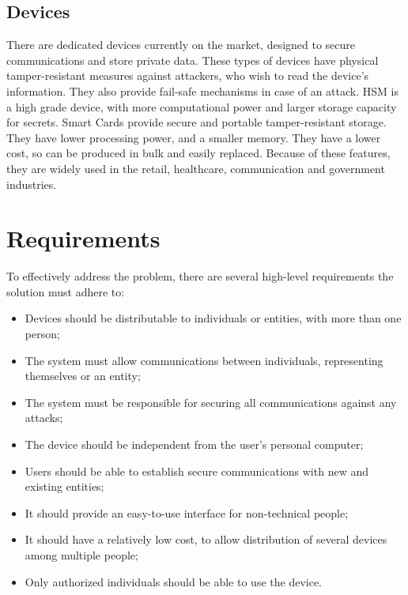\subsection{Devices}\label{chap:problem:devices}

There are dedicated devices currently on the market, designed to secure communications and store private data.
These types of devices have physical tamper-resistant measures against attackers, who wish to read the device's information. They also provide fail-safe mechanisms in case of an attack.
HSM is a high grade device, with more computational power and larger storage capacity for secrets.
Smart Cards provide secure and portable tamper-resistant storage. They have lower processing power, and a smaller memory. They have a lower cost, so can be produced in bulk and easily replaced.
Because of these features, they are widely used in the retail, healthcare, communication and government industries.

\section{Requirements}\label{chap:problem:requirements}

To effectively address the problem, there are several high-level requirements the solution must adhere to:
\begin{itemize}
	\item Devices should be distributable to individuals or entities, with more than one person;
	\item The system must allow communications between individuals, representing themselves or an entity;
	\item The system must be responsible for securing all communications against any attacks;
	\item The device should be independent from the user's personal computer;
	\item Users should be able to establish secure communications with new and existing entities;
	\item It should provide an easy-to-use interface for non-technical people;
	\item It should have a relatively low cost, to allow distribution of several devices among multiple people;
	\item Only authorized individuals should be able to use the device.
\end{itemize}

